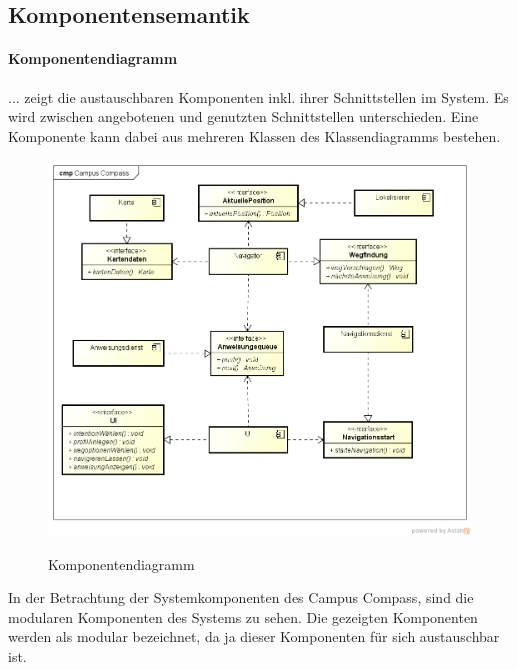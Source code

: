 \begin{samepage}
\chapter{Komponentensemantik}

\subsubsection*{Komponentendiagramm}
... zeigt die austauschbaren Komponenten inkl. ihrer Schnittstellen im System. Es wird zwischen angebotenen und genutzten Schnittstellen unterschieden. Eine Komponente kann dabei aus mehreren Klassen des Klassendiagramms bestehen.
\nopagebreak[4]
\begin{figure}[hbt]
  \centering
  \includegraphics[scale=0.45]{img/komponentendiagramm_neu.png}
  \label{img:komponentendiagramm}
  \caption{Komponentendiagramm}
\end{figure}
\nopagebreak[4]
In der Betrachtung der Systemkomponenten des Campus Compass, sind die modularen Komponenten des Systems zu sehen. Die gezeigten Komponenten werden als modular bezeichnet, da ja dieser Komponenten für sich austauschbar ist.
\nopagebreak[4]
\end{samepage}
